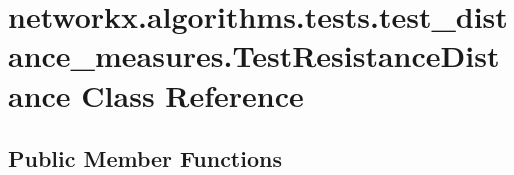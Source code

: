 \hypertarget{classnetworkx_1_1algorithms_1_1tests_1_1test__distance__measures_1_1TestResistanceDistance}{}\section{networkx.\+algorithms.\+tests.\+test\+\_\+distance\+\_\+measures.\+Test\+Resistance\+Distance Class Reference}
\label{classnetworkx_1_1algorithms_1_1tests_1_1test__distance__measures_1_1TestResistanceDistance}
\subsection*{Public Member Functions}

